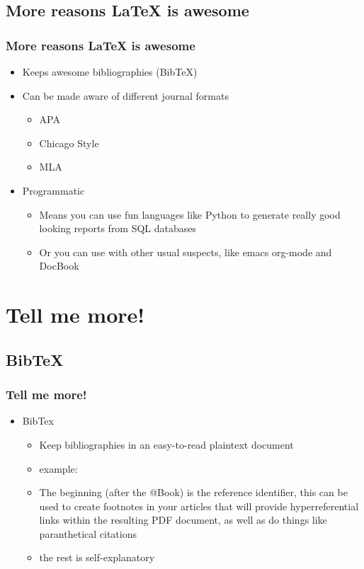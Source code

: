 \documentclass{beamer}
\begin{document}
\subsection{More reasons LaTeX is awesome}
\begin{frame}
  \frametitle{More reasons LaTeX is awesome}
  \begin{itemize}
    \item Keeps awesome bibliographies (BibTeX)
    \item Can be made aware of different journal formats
      \begin{itemize}
        \item APA
        \item Chicago Style
        \item MLA
      \end{itemize}
    \item Programmatic
      \begin{itemize}
      \item Means you can use fun languages like Python to generate
        really good looking reports from SQL databases
      \item Or you can use with other usual suspects, like emacs
        org-mode and DocBook
      \end{itemize}
  \end{itemize}
\end{frame}

\section{Tell me more!}
\subsection{BibTeX}
\begin{frame}
  \frametitle{Tell me more!}
  \begin{itemize}
    \item BibTex
      \begin{itemize}
        \item Keep bibliographies in an easy-to-read plaintext document
        \item example:
          
        \item The beginning (after the @Book) is the reference
          identifier, this can be used to create footnotes in your
          articles that will provide hyperreferential links within the
          resulting PDF document, as well as do things like
          paranthetical citations
        \item the rest is self-explanatory
      \end{itemize}
  \end{itemize}
\end{frame}
\end{document}
